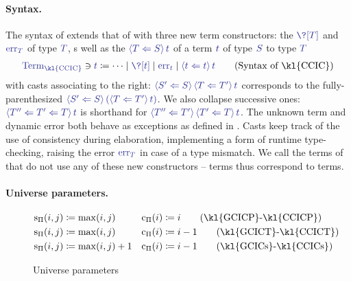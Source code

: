 \paragraph{Syntax.}
\AP The syntax of %
extends that of 
with three new term constructors: the  $\tcol{\?[T]}$ and
 $\tcol{\err[T]}$ of type $\tcol{T}$, 
s well as the  $\tcol{\cast{S}{T}{t}}$
of a term $\tcol{t}$ of type $\tcol{S}$ to type $\tcol{T}$
%
\begin{align}
  \label{fig:syntax-castcic}
  \tcol{\terms{\kl{CCIC}}} \ni \tcol{t} \coloneqq \dots \mid \tcol{\?[t]} \mid \tcol{\err[t]} \mid \tcol{\cast{t}{t}{t}} \tag{Syntax of \kl{CCIC}}
\end{align}
%
with casts associating to the right:
$\tcol{\cast{S}{S'}{\cast{T'}{T}{t}}}$ corresponds to the fully-parenthesized
$\tcol{\cast{S}{S'}{\left(\cast{T'}{T}{t}\right)}}$.
We also collapse successive ones:
$\tcol{\cast{T}{T'' \Leftarrow T'}{t}}$ is shorthand for
$\tcol{\cast{T'}{T''}{\cast{T}{T'}{t}}}$.
The unknown term and dynamic error both behave as exceptions as
defined in  .
%
Casts keep track of the use of consistency during elaboration, implementing
a form of runtime type-checking, raising the error $\tcol{\err[T]}$ in case of a type mismatch.
%
We call  the terms of  that do not use any of these new
constructors –   terms thus correspond to  terms.

\paragraph{Universe parameters.}

\begin{figure}
\begin{align}
\sortOfPi{i}{j} &\coloneqq \max(i,j) &  \castOfPi{i} &\coloneqq i \label{eq:spi-cpi-gcicp}\tag{\text{\kl{GCICP}-\kl{CCICP}}}\\
\sortOfPi{i}{j} &\coloneqq \max(i,j) & \castOfPi{i} &\coloneqq i-1 \label{eq:spi-cpi-gcict}\tag{\text{\kl{GCICT}-\kl{CCICT}}}\\
\sortOfPi{i}{j} &\coloneqq \max(i,j)+1 &  \castOfPi{i} &\coloneqq i-1 \label{eq:spi-cpi-gcics}\tag{\text{\kl{GCICs}-\kl{CCICs}}}
\end{align}
	\caption{Universe parameters}
	\label{fig:univ-param}
\end{figure}

